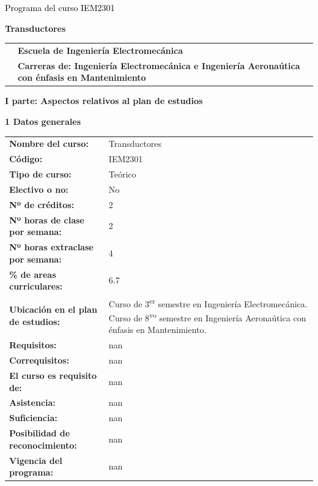\documentclass[letterpaper]{article}%
\begin{document}
%
\normalsize%
\thispagestyle{empty}%
%
\vspace*{150mm}%
\par\fontsize{14}{0}\selectfont \textcolor{black}{Programa del curso IEM2301}%
\par\fontsize{18}{25}\selectfont \textbf{\textcolor{azulsuaveTEC}{Transductores}}%
\renewcommand{\arraystretch}{0.7}%
\begin{longtable}{m{}m{}}%
&\hspace*{0mm}\fontsize{12}{14}\selectfont \textbf{\textcolor{gris}{Escuela de Ingeniería Electromecánica}}\\%
&\hspace*{0mm}\fontsize{12}{14}\selectfont \textbf{\textcolor{gris}{Carreras de: Ingeniería Electromecánica e Ingeniería Aeronaútica con énfasis en Mantenimiento}}\\%
\end{longtable}%
\newpage%
\pagestyle{headfoot}%
\par\fontsize{14}{0}\selectfont \textbf{\textcolor{parte}{I parte: Aspectos relativos al plan de estudios}}%
\par\hspace*{4mm}\fontsize{12}{20}\selectfont \textbf{\textcolor{parte}{1 Datos generales}}%
\renewcommand{\arraystretch}{1.5}%
\begin{longtable}{m{7cm}m{9cm}}%
\textbf{Nombre del curso:}&Transductores\\%
\textbf{Código:}&IEM2301\\%
\textbf{Tipo de curso:}&Teórico\\%
\textbf{Electivo o no:}&No\\%
\textbf{Nº de créditos:}&2\\%
\textbf{Nº horas de clase por semana:}&2\\%
\textbf{Nº horas extraclase por semana:}&4\\%
\textbf{\% de areas curriculares:}&6.7\\%
\textbf{Ubicación en el plan de estudios:}&Curso de 3\textsuperscript{er} semestre en Ingeniería Electromecánica. Curso de 8\textsuperscript{vo} semestre en Ingeniería Aeronaútica con énfasis en Mantenimiento. \\%
\textbf{Requisitos:}&nan\\%
\textbf{Correquisitos:}&nan\\%
\textbf{El curso es requisito de:}&nan\\%
\textbf{Asistencia:}&nan\\%
\textbf{Suficiencia:}&nan\\%
\textbf{Posibilidad de reconocimiento:}&nan\\%
\textbf{Vigencia del programa:}&nan\\%
\end{longtable}%
\end{document}
